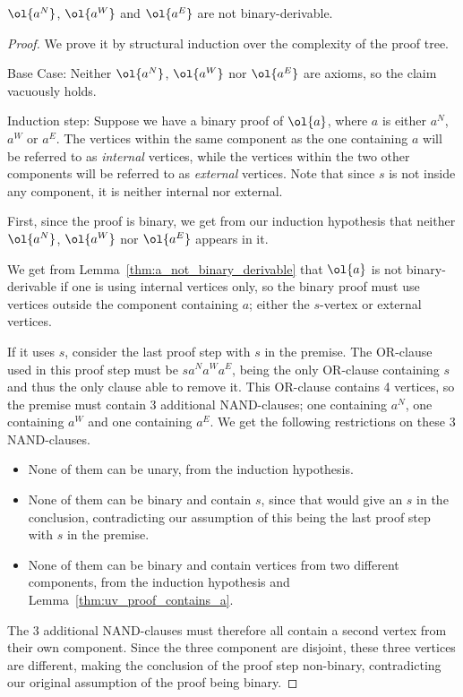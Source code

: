 \begin{lemma}
  $\ol{a^N}$, $\ol{a^W}$ and $\ol{a^E}$ are not binary-derivable.
  \label{thm:non_binary_derivable_a}
\end{lemma}
\begin{proof}
  We prove it by structural induction over the complexity of the proof tree.

  Base Case:
  Neither $\ol{a^N}$, $\ol{a^W}$ nor $\ol{a^E}$ are axioms, so the claim vacuously holds.

  Induction step:
  Suppose we have a binary proof of $\ol{a}$, where $a$ is either $a^N$, $a^W$ or $a^E$.
  The vertices within the same component as the one containing $a$ will be referred to as \textit{internal} vertices, while the vertices within the two other components will be referred to as \textit{external} vertices.
  Note that since $s$ is not inside any component, it is neither internal nor external.

  First, since the proof is binary, we get from our induction hypothesis that neither $\ol{a^N}$, $\ol{a^W}$ nor $\ol{a^E}$ appears in it.

  We get from Lemma~\ref{thm:a_not_binary_derivable} that $\ol{a}$ is not binary-derivable if one is using internal vertices only, so the binary proof must use vertices outside the component containing $a$; either the $s$-vertex or external vertices.

  If it uses $s$, consider the last proof step with $s$ in the premise.
  The OR-clause used in this proof step must be $sa^Na^Wa^E$, being the only OR-clause containing $s$ and thus the only clause able to remove it.
  This OR-clause contains 4 vertices, so the premise must contain 3 additional NAND-clauses;
  one containing $a^N$, one containing $a^W$ and one containing $a^E$.
  We get the following restrictions on these 3 NAND-clauses.
  \begin{itemize}
    \item None of them can be unary, from the induction hypothesis.
    \item None of them can be binary and contain $s$, since that would give an $s$ in the conclusion, contradicting our assumption of this being the last proof step with $s$ in the premise.
    \item None of them can be binary and contain vertices from two different components, from the induction hypothesis and Lemma~\ref{thm:uv_proof_contains_a}.
  \end{itemize}
  The 3 additional NAND-clauses must therefore all contain a second vertex from their own component.
  Since the three component are disjoint, these three vertices are different, making the conclusion of the proof step non-binary, contradicting our original assumption of the proof being binary.


\end{proof}
